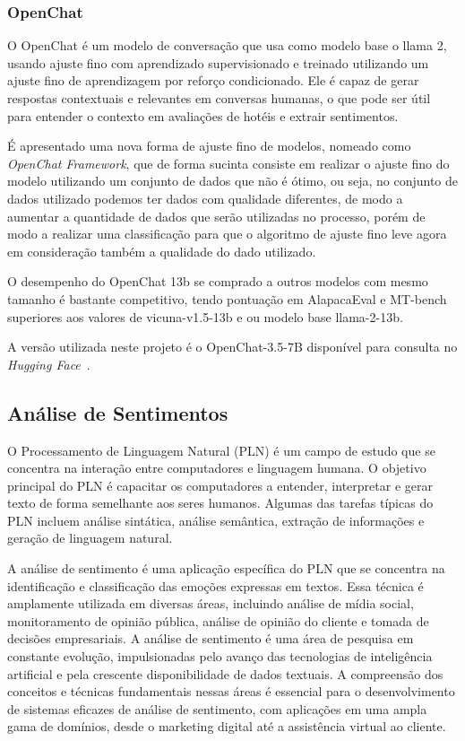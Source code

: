 \subsubsection{OpenChat}
\label{cap:fund_teorica:sec:modelos:subsec:openchat}

O OpenChat \cite{wang2024openchat} é um modelo de conversação que usa como modelo base o llama 2, usando ajuste fino com aprendizado supervisionado e treinado utilizando um ajuste fino de aprendizagem por reforço condicionado. Ele é capaz de gerar respostas contextuais e relevantes em conversas humanas, o que pode ser útil para entender o contexto em avaliações de hotéis e extrair sentimentos.

É apresentado uma nova forma de ajuste fino de modelos, nomeado como \textit{OpenChat Framework}, que de forma sucinta consiste em realizar o ajuste fino do modelo utilizando um conjunto de dados que não é ótimo, ou seja, no conjunto de dados utilizado podemos ter dados com qualidade diferentes, de modo a aumentar a quantidade de dados que serão utilizadas no processo, porém de modo a realizar uma classificação para que o algoritmo de ajuste fino leve agora em consideração também a qualidade do dado utilizado.

O desempenho do OpenChat 13b se comprado a outros modelos com mesmo tamanho é bastante competitivo, tendo pontuação em AlapacaEval e MT-bench superiores aos valores de vicuna-v1.5-13b e ou modelo base llama-2-13b.

A versão utilizada neste projeto é o OpenChat-3.5-7B disponível para consulta no \textit{Hugging Face}~\cite{openChat357b}.

\subsection{Análise de Sentimentos}
\label{cap:fund_teorica:sec:analise_sentimento}

O Processamento de Linguagem Natural (PLN) é um campo de estudo que se concentra na interação entre computadores e linguagem humana. O objetivo principal do PLN é capacitar os computadores a entender, interpretar e gerar texto de forma semelhante aos seres humanos. Algumas das tarefas típicas do PLN incluem análise sintática, análise semântica, extração de informações e geração de linguagem natural.

A análise de sentimento é uma aplicação específica do PLN que se concentra na identificação e classificação das emoções expressas em textos. Essa técnica é amplamente utilizada em diversas áreas, incluindo análise de mídia social, monitoramento de opinião pública, análise de opinião do cliente e tomada de decisões empresariais. A análise de sentimento é uma área de pesquisa em constante evolução, impulsionadas pelo avanço das tecnologias de inteligência artificial e pela crescente disponibilidade de dados textuais. A compreensão dos conceitos e técnicas fundamentais nessas áreas é essencial para o desenvolvimento de sistemas eficazes de análise de sentimento, com aplicações em uma ampla gama de domínios, desde o marketing digital até a assistência virtual ao cliente.

